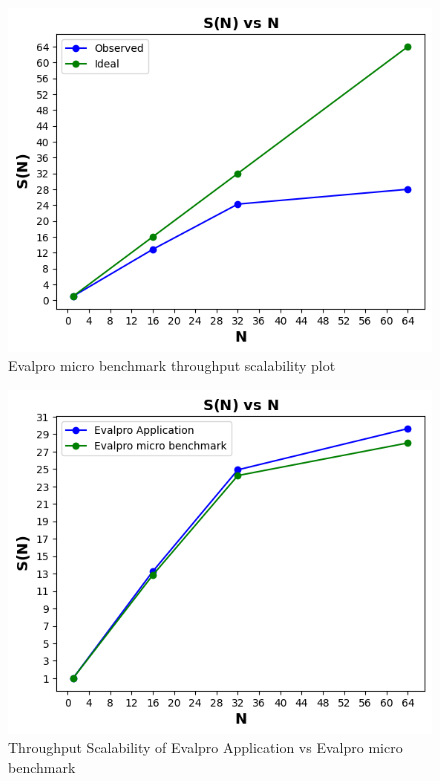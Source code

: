 \documentclass{iitbreport}
\begin{document}
\begin{figure}[!htb]
  \centering
  \includegraphics[scale=0.9]{Images/evalpro_micro_benchmark_scalability.png}
  \caption{Evalpro micro benchmark throughput scalability plot}
  \label{evalpro_micro_bench_mark_scalability}
 
\end{figure}

\begin{figure}[!htb]
  \centering
  \includegraphics[width=\linewidth]{Images/scalability_comparision.png}
  \caption{Throughput Scalability of Evalpro Application vs Evalpro micro benchmark}
  \label{evalpro_scalability_comparision}
\end{figure}
\end{document}
